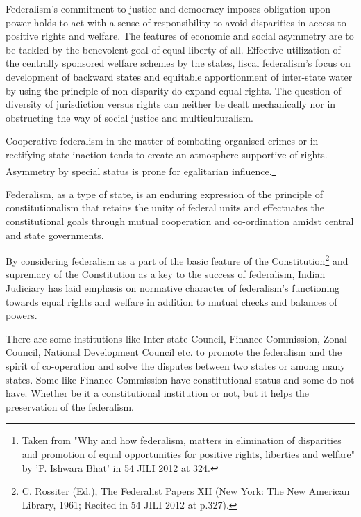 \begin{multicols}{2}
\noi
Federalism's commitment to justice and democracy imposes obligation upon power holds to act
with a sense of responsibility to avoid disparities in access to positive rights and welfare. The
features of economic and social asymmetry are to be tackled by the benevolent goal of equal
liberty of all. Effective utilization of the centrally sponsored welfare schemes by the states, fiscal
federalism's focus on development of backward states and equitable apportionment of inter-state
water by using the principle of non-disparity do expand equal rights. The question of diversity of
jurisdiction versus rights can neither be dealt mechanically nor in obstructing the way of social
justice and multiculturalism.

\noi
Cooperative federalism in the matter of combating organised crimes or in rectifying state inaction
tends to create an atmosphere supportive of rights. Asymmetry by special status is prone for
egalitarian influence.\footnote{Taken from "Why and how federalism, matters in elimination of disparities and promotion of equal opportunities for positive rights, liberties and welfare" by 'P. Ishwara Bhat' in 54 JILI 2012 at 324.}

\vspace{-.1cm}

\noi
Federalism, as a type of state, is an enduring expression of the principle of constitutionalism that
retains the unity of federal units and effectuates the constitutional goals through mutual cooperation and co-ordination amidst central and state governments.

\vspace{-.1cm}

\noi
By considering federalism as a part of the basic feature of the Constitution\footnote{C. Rossiter (Ed.), The Federalist Papers XII (New York: The New American Library, 1961; Recited in 54 JILI 2012 at p.327).} and supremacy of the Constitution as a key to the success of federalism, Indian Judiciary has laid emphasis on normative character of federalism's functioning towards equal rights and welfare in addition to mutual checks and balances of powers.

\vspace{-.1cm}

\noi
There are some institutions like Inter-state Council, Finance Commission, Zonal Council,
National Development Council etc. to promote the federalism and the spirit of co-operation and
solve the disputes between two states or among many states. Some like Finance Commission have
constitutional status and some do not have. Whether be it a constitutional institution or not, but it
helps the preservation of the federalism.


\end{multicols}
